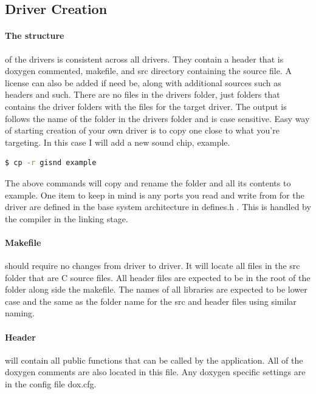 \documentclass{article}
\begin{document}
  \subsection{Driver Creation}

  \paragraph{The structure}of the drivers is consistent across all drivers. They contain a header that is doxygen commented, makefile, and src directory containing the source file.
  A license can also be added if need be, along with additional sources such as headers and such. There are no files in the drivers folder, just folders that contains the driver folders
  with the files for the target driver. The output is follows the name of the folder in the drivers folder and is case sensitive. Easy way of starting creation of your own driver
  is to copy one close to what you're targeting. In this case I will add a new sound chip, example.

  \begin{lstlisting}[language=bash]
$ cp -r gisnd example
  \end{lstlisting}

  The above commands will copy and rename the folder and all its contents to example. One item to keep in mind is any ports you read and write from for the driver are defined in the base
  system architecture in defines.h . This is handled by the compiler in the linking stage.

  \paragraph{Makefile} should require no changes from driver to driver. It will locate all files in the src folder that are C source files. All header files are expected to be
  in the root of the folder along side the makefile. The names of all libraries are expected to be lower case and the same as the folder name for the src and header files using similar naming.

  \paragraph{Header} will contain all public functions that can be called by the application. All of the doxygen comments are also located in this file. Any doxygen specific settings are in
  the config file dox.cfg.

  \newpage
\end{document}
